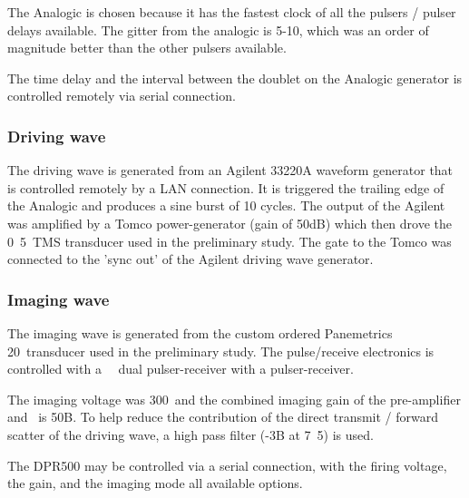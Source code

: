 The Analogic is chosen because it has the fastest clock of all the pulsers / pulser delays available.
The gitter from the analogic is  5-10\nano\second, which was an order of magnitude better than the other pulsers available.


The time delay and the interval between the doublet
on the Analogic generator is controlled remotely via serial connection.


\subsubsection{Driving wave}
The driving wave is generated from an Agilent  33220A waveform generator
that is controlled remotely by a LAN connection.
It is triggered the trailing edge of the Analogic
 and produces  a sine burst of 10 cycles.
The output of the Agilent was amplified by a  Tomco power-generator (gain of \unit{50}dB)
which then drove the \unit{0.5}\mega\hertz\ TMS transducer used in the preliminary study.
The gate to the Tomco was connected to the 'sync out' of the Agilent driving wave generator.



\subsubsection{Imaging wave}
The imaging wave is generated from the custom ordered Panemetrics \unit{20}\mega\hertz\
transducer used in the preliminary study.
The pulse/receive electronics is controlled 
with a \JsrUltrasonics\ \ dual pulser-receiver
with a  pulser-receiver.

The imaging voltage was \unit{300}\volt\ and the combined imaging gain 
of the pre-amplifier and \DPR500\ is \unit{50}\deci B.
To help reduce the contribution of the direct transmit / forward scatter of
the driving wave, a high pass filter (-\unit{3}\deci B at \unit{7.5}\mega\hertz)
is used.

The DPR500 may be controlled via a serial connection,
with the  firing voltage, the gain,
and the imaging mode all available options.



